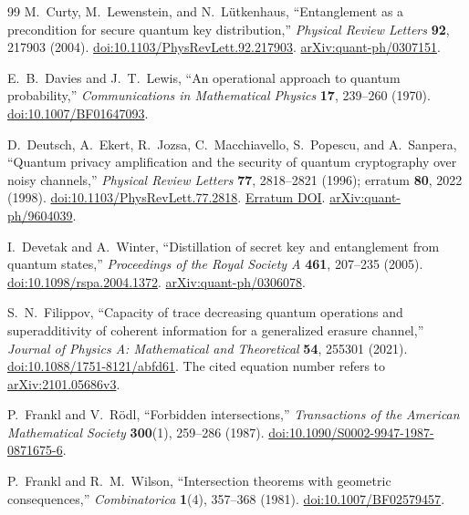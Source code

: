 \begin{thebibliography}{99}
M.~Curty, M.~Lewenstein, and N.~L\"utkenhaus,
``Entanglement as a precondition for secure quantum key distribution,''
\emph{Physical Review Letters} \textbf{92}, 217903 (2004).
\href{https://doi.org/10.1103/PhysRevLett.92.217903}{doi:10.1103/PhysRevLett.92.217903}.
\href{https://arxiv.org/abs/quant-ph/0307151}{arXiv:quant-ph/0307151}.

E.~B.~Davies and J.~T.~Lewis,
``An operational approach to quantum probability,''
\emph{Communications in Mathematical Physics} \textbf{17}, 239--260 (1970).
\href{https://doi.org/10.1007/BF01647093}{doi:10.1007/BF01647093}.

D.~Deutsch, A.~Ekert, R.~Jozsa, C.~Macchiavello, S.~Popescu, and A.~Sanpera,
``Quantum privacy amplification and the security of quantum cryptography over noisy channels,''
\emph{Physical Review Letters} \textbf{77}, 2818--2821 (1996);
erratum \textbf{80}, 2022 (1998).
\href{https://doi.org/10.1103/PhysRevLett.77.2818}{doi:10.1103/PhysRevLett.77.2818}.
\href{https://doi.org/10.1103/PhysRevLett.80.2022}{Erratum DOI}.
\href{https://arxiv.org/abs/quant-ph/9604039}{arXiv:quant-ph/9604039}.

I.~Devetak and A.~Winter,
``Distillation of secret key and entanglement from quantum states,''
\emph{Proceedings of the Royal Society A} \textbf{461}, 207--235 (2005).
\href{https://doi.org/10.1098/rspa.2004.1372}{doi:10.1098/rspa.2004.1372}.
\href{https://arxiv.org/abs/quant-ph/0306078}{arXiv:quant-ph/0306078}.

S.~N.~Filippov,
``Capacity of trace decreasing quantum operations and
superadditivity of coherent information for a generalized erasure channel,''
\emph{Journal of Physics A: Mathematical and Theoretical} \textbf{54}, 255301 (2021).
\href{https://doi.org/10.1088/1751-8121/abfd61}{doi:10.1088/1751-8121/abfd61}.
The cited equation number refers to
\href{https://arxiv.org/abs/2101.05686v3}{arXiv:2101.05686v3}.

P.~Frankl and V.~R\"odl,
``Forbidden intersections,''
\emph{Transactions of the American Mathematical Society} \textbf{300}(1),
259--286 (1987).
\href{https://doi.org/10.1090/S0002-9947-1987-0871675-6}{doi:10.1090/S0002-9947-1987-0871675-6}.

P.~Frankl and R.~M.~Wilson,
``Intersection theorems with geometric consequences,''
\emph{Combinatorica} \textbf{1}(4), 357--368 (1981).
\href{https://doi.org/10.1007/BF02579457}{doi:10.1007/BF02579457}.


\end{thebibliography}
